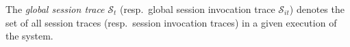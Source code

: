 \documentclass[journal,compsoc]{IEEEtran}
\begin{document}
The \emph{global session trace} $\mathcal{S}_t$ (resp.\ global session invocation trace $\mathcal{S}_{it}$) denotes the set of all
   session traces (resp.\ session invocation traces) in a given execution of the system.
\end{document}
